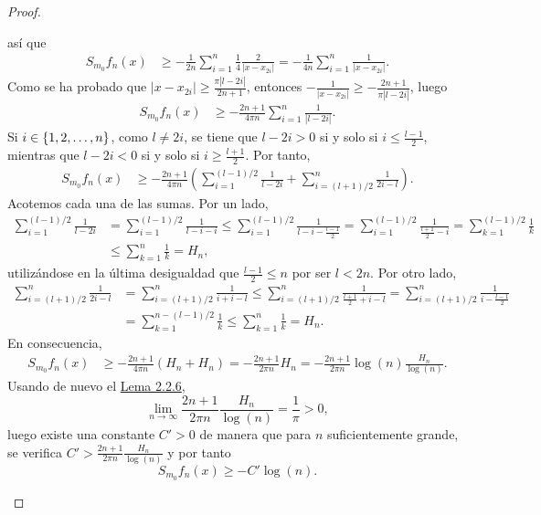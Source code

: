 \documentclass[a4paper, 12pt, oneside]{book}
\begin{document}
\begin{proof}
\begin{itemize}
        así que
        \begin{align*}
            S_{m_0}f_n(x) &\geq -\frac{1}{2n}\sum_{i=1}^n \frac{1}{4}\frac{2}{|x-x_{2i}|} = -\frac{1}{4n}\sum_{i=1}^n \frac{1}{|x-x_{2i}|}.
        \end{align*}
        Como se ha probado que $|x-x_{2i}| \geq \frac{\pi |l -2i|}{2n+1}$, entonces $-\frac{1}{|x-x_{2i}|} \geq -\frac{2n+1}{\pi|l-2i|}$, luego
        \begin{align*}
            S_{m_0}f_n(x) &\geq -\frac{2n+1}{4\pi n}\sum_{i=1}^n \frac{1}{|l-2i|}.
        \end{align*}
        Si $i \in \{1,2,\mathellipsis,n\}$, como $l \neq 2i$, se tiene que $l - 2i > 0$ si y solo si $i \leq \frac{l-1}{2}$, mientras que $l - 2i < 0$ si y solo si $i \geq \frac{l+1}{2}$. Por tanto,
        \begin{align*}
            S_{m_0}f_n(x) &\geq -\frac{2n+1}{4\pi n}\left(\sum_{i=1}^{(l-1)/2} \frac{1}{l-2i} +\sum_{i=(l+1)/2}^n \frac{1}{2i-l}\right).
        \end{align*}
        Acotemos cada una de las sumas. Por un lado,
        \begin{align*}
            \sum_{i=1}^{(l-1)/2}\frac{1}{l-2i} &= \sum_{i=1}^{(l-1)/2} \frac{1}{l-i-i} \leq \sum_{i=1}^{(l-1)/2} \frac{1}{l-i-\frac{l-1}{2}} = \sum_{i=1}^{(l-1)/2} \frac{1}{\frac{l+1}{2}-i} = \sum_{k=1}^{(l-1)/2} \frac{1}{k} \\ &\leq \sum_{k=1}^{n}\frac{1}{k} = H_n,
        \end{align*}
        utilizándose en la última desigualdad que $\frac{l-1}{2} \leq n$ por ser $l < 2n$. Por otro lado,
        \begin{align*}
            \sum_{i=(l+1)/2}^n \frac{1}{2i-l} &= \sum_{i=(l+1)/2}^n \frac{1}{i+i-l} \leq \sum_{i=(l+1)/2}^n \frac{1}{\frac{l+1}{2}+i-l} = \sum_{i=(l+1)/2}^n \frac{1}{i-\frac{l-1}{2}} \\ &= \sum_{k=1}^{n-(l-1)/2}\frac{1}{k} \leq \sum_{k=1}^n \frac{1}{k} = H_n.
        \end{align*}
        En consecuencia,
        \begin{align*}
            S_{m_0}f_n(x) &\geq -\frac{2n+1}{4\pi n}(H_n+H_n) = -\frac{2n+1}{2\pi n}H_n =-\frac{2n+1}{2\pi n}\log(n)\frac{H_n}{\log(n)} .
        \end{align*}
        Usando de nuevo el \hyperref[2.2.6]{\color{blue}Lema 2.2.6},
        \[\lim_{n\to\infty} \frac{2n+1}{2\pi n}\frac{H_n}{\log(n)} = \frac{1}{\pi} > 0,\]
        luego existe una constante $C'>0$ de manera que para $n$ suficientemente grande, se verifica $C' > \frac{2n+1}{2\pi n}\frac{H_n}{\log(n)}$ y por tanto
        \[S_{m_0}f_n(x) \geq -C'\log(n).\]
    

\end{itemize}
\end{proof}
\end{document}
